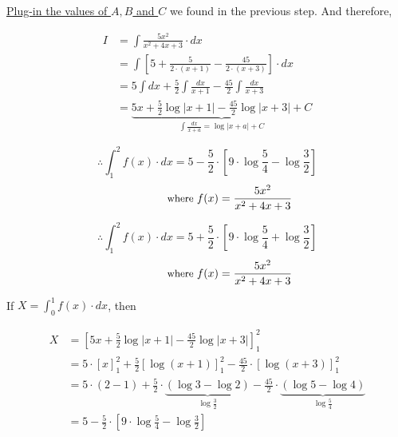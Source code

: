 \documentclass[14pt,fleqn]{extarticle}
\begin{document}
\underline{Plug-in the values of $A,B$ and $C$} we found in the previous step. And therefore, 

\begin{align}
I &= \int \frac{5x^2}{x^2+4x+3}\cdot dx \\
&= \int \left[5 + \frac{5}{2\cdot (x+1)} - \frac{45}{2\cdot (x+3)} \right]\cdot dx \\ 	
&= 5\int dx + \frac{5}{2}\int \frac{dx}{x+1} - \frac{45}{2}\int \frac{dx}{x+3} \\
&= \underbrace{5x + \frac{5}{2}\log\vert x+1\vert -\frac{45}{2}\log\vert x+3\vert + C}_{\int\frac{dx}{x+a} = \log\vert x+a\vert + C }
\end{align}
\newcard 

          \[\therefore \int_1^2 f(x)\cdot dx  = 5 -\frac{5}{2}\cdot \left[9\cdot\log\frac{5}{4} - \log\frac{3}{2}\right]\]
          \[\qquad\qquad\small\text{where } f(x) = \frac{5x^2}{x^2+4x+3}\]
        

\newcard
          \[\therefore \int_1^2 f(x)\cdot dx = 5 + \frac{5}{2}\cdot \left[9\cdot\log\frac{5}{4} + \log\frac{3}{2}\right]\]
          \[\qquad\qquad\small\text{where } f(x) = \frac{5x^2}{x^2+4x+3}\]
        

\newcard

If $X = \int_0^1 f(x)\cdot dx$, then 

\begin{align}
	X &= \left[5x + \frac{5}{2}\log\vert x+1\vert -\frac{45}{2}\log\vert x+3\vert \right]_1^2 \\
          &= 5\cdot \left[x\right]_1^2 + \frac{5}{2}\left[\log (x+1)\right]_1^2 
          -\frac{45}{2}\cdot \left[\log (x+3)\right]_1^2 \\
          &= 5\cdot(2-1) + \frac{5}{2}\cdot \underbrace{(\log 3 - \log 2)}_{\log\frac{3}{2}}-\frac{45}{2}\cdot \underbrace{(\log 5 - \log 4)}_{\log\frac{5}{4}} \\
          &= 5 -\frac{5}{2}\cdot \left[9\cdot\log\frac{5}{4} - \log\frac{3}{2}\right]
        \end{align}
\end{document}
